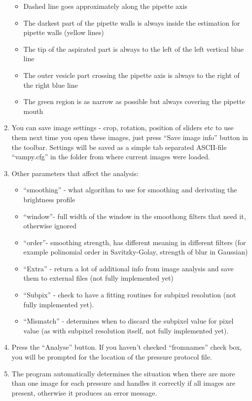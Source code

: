 \begin{enumerate}
	\begin{itemize}
		\item Dashed line goes approximately along the pipette axis
		\item The darkest part of the pipette walls is always inside the estimation for pipette walls (yellow lines)
		\item The tip of the aspirated part is always to the left of the left vertical blue line
		\item The outer vesicle part crossing the pipette axis is always to the right of the right blue line
		\item The green region is as narrow as possible but always covering the pipette mouth
	\end{itemize} 
	\item You can save image settings - crop, rotation, position of sliders etc to use them next time you open these images, just press ``Save image info'' button in the toolbar. Settings will be saved as a simple tab separated ASCII-file ``vampy.cfg'' in the folder from where current images were loaded.
	\item Other parameters that affect the analysis:
	\begin{itemize}
		\item ``smoothing'' - what algorithm to use for smoothing and derivating the brightness profile
		\item ``window''- full width of the window in the smoothong filters that need it, otherwise ignored
		\item ``order''- smoothing strength, has different meaning in different filters (for example polinomial order in Savitzky-Golay, strength of blur in Gaussian)
		\item ``Extra'' - return a lot of additional info from image analysis and save them to external files (not fully implemented yet)
		\item ``Subpix'' - check to have a fitting routines for subpixel resolution (not fully implemented yet).
		\item ``Mismatch'' - determines when to discard the subpixel value for pixel value (as with subpixel resolution itself, not fully implemented yet).
	\end{itemize}
	\item Press the ``Analyse'' button. If you haven't checked ``fromnames'' check box, you will be prompted for the location of the pressure protocol file.
	\item The program automatically determines the situation when there are more than one image for each pressure and handles it correctly if all images are present, otherwise it produces an error message.

\end{enumerate}
